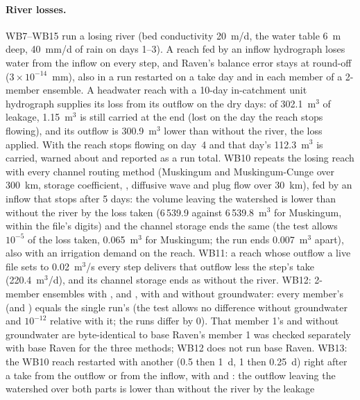 \paragraph{River losses.}  WB7--WB15 run a losing river (bed conductivity 20~m/d, the
water table 6~m deep, 40~mm/d of rain on days 1--3). A reach fed by an inflow hydrograph loses water from the inflow on
every step, and Raven's balance error stays at round-off ($3\times10^{-14}$~mm), also in a run restarted on a take day
and in each member of a 2-member ensemble. A headwater reach with a 10-day in-catchment unit hydrograph supplies its loss
from its outflow on the dry days: of 302.1~m$^3$ of leakage, 1.15~m$^3$ is still carried at the end (lost on the day the
reach stops flowing), and its outflow is 300.9~m$^3$ lower than without the river, the loss applied. With
 the reach stops flowing on day~4 and that day's 112.3~m$^3$ is carried, warned about and reported as a
run total. WB10 repeats the losing reach with every channel routing method (Muskingum and Muskingum-Cunge over 300~km,
storage coefficient, , diffusive wave and plug flow over 30~km), fed by an inflow that stops after
5 days: the volume leaving the watershed is lower than without the river by the loss taken (6\,539.9 against
6\,539.8~m$^3$ for Muskingum, within the file's digits) and the channel storage ends the same (the test allows
$10^{-5}$ of the loss taken, 0.065~m$^3$ for Muskingum; the run ends 0.007~m$^3$ apart), also with an irrigation demand on
the reach. WB11: a  reach whose outflow a live file sets to
0.02~m$^3$/s every step delivers that outflow less the step's take (220.4~m$^3$/d), and its channel storage ends as without
the river. WB12: 2-member ensembles with ,  and , with and
without groundwater: every member's  (and ) equals the single run's (the test
allows no difference without groundwater and $10^{-12}$ relative with it; the runs differ by 0). That member 1's
 and  without groundwater are byte-identical to base Raven's member 1
was checked separately with base Raven for the three methods; WB12 does not run base Raven. WB13: the WB10 reach restarted with another 
(0.5 then 1~d, 1 then 0.25~d) right after a take from the outflow or from the inflow, with  and
: the outflow leaving the watershed over both parts is lower than without the river by the leakage
